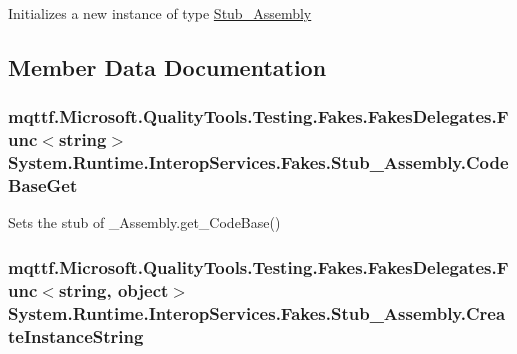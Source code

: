 Initializes a new instance of type \hyperlink{class_system_1_1_runtime_1_1_interop_services_1_1_fakes_1_1_stub___assembly}{Stub\-\_\-\-Assembly}



\subsection{Member Data Documentation}
\hypertarget{class_system_1_1_runtime_1_1_interop_services_1_1_fakes_1_1_stub___assembly_a0158aabf17767f5cfb4c59708f725863}{
\subsubsection[{Code\-Base\-Get}]{\setlength{\rightskip}{0pt plus 5cm}mqttf.\-Microsoft.\-Quality\-Tools.\-Testing.\-Fakes.\-Fakes\-Delegates.\-Func$<$string$>$ System.\-Runtime.\-Interop\-Services.\-Fakes.\-Stub\-\_\-\-Assembly.\-Code\-Base\-Get}}\label{class_system_1_1_runtime_1_1_interop_services_1_1_fakes_1_1_stub___assembly_a0158aabf17767f5cfb4c59708f725863}


Sets the stub of \-\_\-\-Assembly.\-get\-\_\-\-Code\-Base()

\hypertarget{class_system_1_1_runtime_1_1_interop_services_1_1_fakes_1_1_stub___assembly_abe8bdf0cfd070698042a04a98c9eb1ce}{
\subsubsection[{Create\-Instance\-String}]{\setlength{\rightskip}{0pt plus 5cm}mqttf.\-Microsoft.\-Quality\-Tools.\-Testing.\-Fakes.\-Fakes\-Delegates.\-Func$<$string, object$>$ System.\-Runtime.\-Interop\-Services.\-Fakes.\-Stub\-\_\-\-Assembly.\-Create\-Instance\-String}}\label{class_system_1_1_runtime_1_1_interop_services_1_1_fakes_1_1_stub___assembly_abe8bdf0cfd070698042a04a98c9eb1ce}


